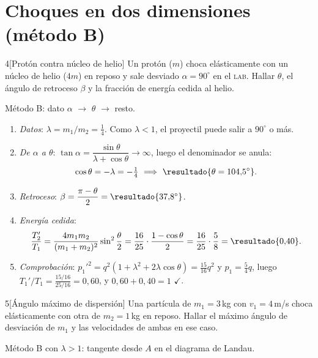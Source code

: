 \documentclass[11pt,a4paper,twoside]{article}
\newcommand{\lab}{\textup{\textsc{lab}}}
\newcommand{\ok}{\textcolor{verde}{$\checkmark$}}
\newcommand{\metodo}[1]{{\color{tenue}\small\sffamily #1}\par\nopagebreak}
\begin{document}
\section{Choques en dos dimensiones (método B)}

\begin{problema}{4}[Protón contra núcleo de helio]
Un protón ($m$) choca elásticamente con un núcleo de helio ($4m$) en reposo y sale desviado
$\alpha=90^{\circ}$ en el \lab. Hallar $\theta$, el ángulo de retroceso $\beta$ y la fracción de energía cedida al helio.
\end{problema}
\metodo{Método B: dato $\alpha$ $\to$ $\theta$ $\to$ resto.}

\begin{resolucion}
\begin{enumerate}
  \item \emph{Datos}: $\lambda=m_{1}/m_{2}=\tfrac14$. Como $\lambda<1$, el proyectil puede salir a $90^{\circ}$ o más.
  \item \emph{De $\alpha$ a $\theta$}: $\tan\alpha=\dfrac{\sin\theta}{\lambda+\cos\theta}\to\infty$, luego el denominador se anula:
        \[
          \cos\theta=-\lambda=-\tfrac14\ \Longrightarrow\ \resultado{\theta=104{,}5^{\circ}} .
        \]
  \item \emph{Retroceso}: $\beta=\dfrac{\pi-\theta}{2}=\resultado{37{,}8^{\circ}}$.
  \item \emph{Energía cedida}:
        \[
          \frac{T_{2}'}{T_{1}}=\frac{4m_{1}m_{2}}{(m_{1}+m_{2})^{2}}\sin^{2}\frac\theta2=\frac{16}{25}\cdot\frac{1-\cos\theta}{2}=\frac{16}{25}\cdot\frac58=\resultado{0{,}40} .
        \]
  \item \emph{Comprobación}: $p_{1}'^{2}=q^{2}(1+\lambda^{2}+2\lambda\cos\theta)=\tfrac{15}{16}q^{2}$ y $p_{1}=\tfrac54q$, luego
        $T_{1}'/T_{1}=\frac{15/16}{25/16}=0{,}60$, y $0{,}60+0{,}40=1$ \ok{}.
\end{enumerate}
\end{resolucion}

\begin{problema}{5}[Ángulo máximo de dispersión]
Una partícula de $m_{1}=3$\,kg con $v_{1}=4$\,m/s choca elásticamente con otra de $m_{2}=1$\,kg en reposo.
Hallar el máximo ángulo de desviación de $m_{1}$ y las velocidades de ambas en ese caso.
\end{problema}
\metodo{Método B con $\lambda>1$: tangente desde $A$ en el diagrama de Landau.}
\end{document}
